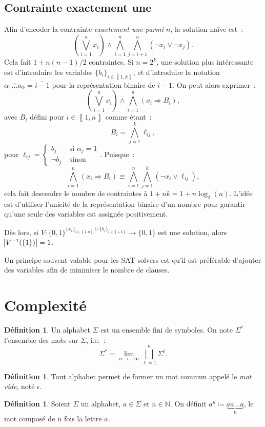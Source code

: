 \documentclass{article}
\theoremstyle{definition}
\newtheorem{déf}[thm]{Définition}
\theoremstyle{remark}
\newcommand{\intint}[2]{\left\llbracket#1, #2\right\rrbracket}
\newcommand{\N}{\mathbb N}
\begin{document}
	\subsection{Contrainte exactement une}
		Afin d'encoder la contrainte \textit{exactement une parmi $n$}, la solution naïve est~:
		\[\left(\bigvee_{i=1}^nx_i\right) \land \bigwedge_{i=1}^n\bigwedge_{j=i+1}^n(\lnot x_i \lor \lnot x_j).\]
		Cela fait $1+n(n-1)/2$ contraintes. Si $n=2^k$, une solution plus intéressante est d'introduire les variables $\{b_i\}_{i \in \intint 1k}$, et d'introduire
		la notation $\overline {\alpha_1\ldots\alpha_k} = \overline {i-1}$ pour la représentation binaire de $i-1$. On peut alors exprimer~:
		\[\left(\bigvee_{i=1}^nx_i\right) \land \bigwedge_{i=1}^n(x_i \Rightarrow B_i),\]
		avec $B_i$ défini pour $i \in \intint 1n$ comme étant~:
		\[B_i = \bigwedge_{j=1}^k\ell_{ij},\]
		pour $\ell_{ij} = \begin{cases}b_j &\text{ si }\alpha_j = 1 \\\lnot b_j&\text{ sinon}\end{cases}$. Puisque~:
		\[\bigwedge_{i=1}^n(x_i \Rightarrow B_i) \equiv \bigwedge_{i=1}^n\bigwedge_{j=1}^k(\lnot x_i \lor \ell_{ij}),\]
		cela fait descendre le nombre de contraintes à $1+nk = 1+n\log_2(n)$. L'idée est d'utiliser l'unicité de la représentation binaire d'un nombre pour garantir
		qu'une seule des variables est assignée positivement.

		Dès lors, si $V : \{0, 1\}^{\{x_i\}_{i \in \intint 1n} \cup \{b_i\}_{i \in \intint 1k}} \to \{0, 1\}$ est une solution, alors $\abs {V^{-1}(\{1\})} = 1$.

		Un principe souvent valable pour les SAT-solvers est qu'il est préférable d'ajouter des variables afin de minimiser le nombre de clauses.

\section{Complexité}
	\begin{déf} Un alphabet $\Sigma$ est un ensemble fini de symboles. On note $\Sigma^*$ l'ensemble des mots sur $\Sigma$, i.e.~:
	\[\Sigma^* = \lim_{n \to +\infty}\bigsqcup_{\ell=1}^n\Sigma^\ell.\]
	\end{déf}

	\begin{déf} Tout alphabet permet de former un mot commun appelé le \textit{mot vide}, noté $\epsilon$.
	\end{déf}

	\begin{déf} Soient $\Sigma$ un alphabet, $a \in \Sigma$ et $n \in \N$. On définit $a^n \coloneqq \underbrace {aa\ldots a}_{n}$, le mot composé de $n$ fois la
	lettre $a$.
	\end{déf}
\end{document}
